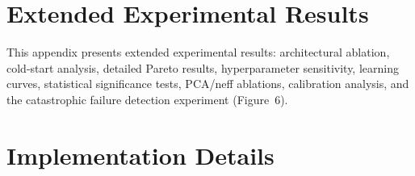 \documentclass[10pt,letterpaper]{article}
\begin{document}



\section{Extended Experimental Results}
\label{appendix:extended_results}

This appendix presents extended experimental results: architectural ablation,
cold-start analysis, detailed Pareto results, hyperparameter sensitivity,
learning curves, statistical significance tests, PCA/neff ablations,
calibration analysis, and the catastrophic failure detection experiment (Figure~6).


















\section{Implementation Details}
\label{appendix:implementation_details}
\end{document}
